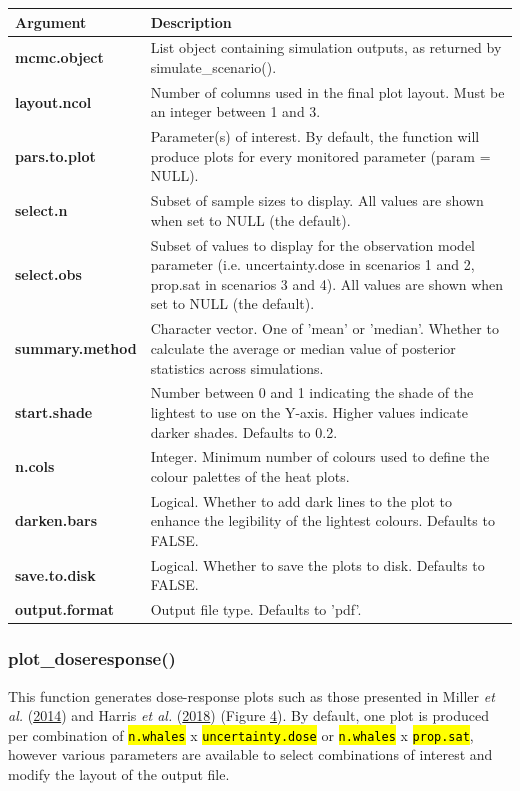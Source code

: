 \documentclass[
]{article}
\begin{document}
\renewcommand{\arraystretch}{1.4}

\begin{longtable}{>{\bfseries}l|>{\raggedright\arraybackslash}p{30em}}
\toprule
\textbf{Argument} & \textbf{Description}\\
\midrule
mcmc.object & List object containing simulation outputs, as returned by simulate\_scenario().\\
layout.ncol & Number of columns used in the final plot layout. Must be an integer between 1 and 3.\\
pars.to.plot & Parameter(s) of interest. By default, the function will produce plots for every monitored parameter (param = NULL).\\
select.n & Subset of sample sizes to display. All values are shown when set to NULL (the default).\\
select.obs & Subset of values to display for the observation model parameter (i.e. uncertainty.dose in scenarios 1 and 2, prop.sat in scenarios 3 and 4). All values are shown when set to NULL (the default).\\
\addlinespace
summary.method & Character vector. One of 'mean' or 'median'. Whether to calculate the average or median value of posterior statistics across simulations.\\
start.shade & Number between 0 and 1 indicating the shade of the lightest to use on the Y-axis. Higher values indicate darker shades. Defaults to 0.2.\\
n.cols & Integer. Minimum number of colours used to define the colour palettes of the heat plots.\\
darken.bars & Logical. Whether to add dark lines to the plot to enhance the legibility of the lightest colours. Defaults to FALSE.\\
save.to.disk & Logical. Whether to save the plots to disk. Defaults to FALSE.\\
\addlinespace
output.format & Output file type. Defaults to 'pdf'.\\
\bottomrule
\end{longtable}

\subsubsection{plot\_doseresponse()}

This function generates dose-response plots such as those presented in Miller \emph{et al.} (\protect\hyperlink{ref-Miller2014}{2014}) and Harris \emph{et al.} (\protect\hyperlink{ref-Harris2018}{2018}) (Figure \hyperlink{fig4}{4}). By default, one plot is produced per combination of \textcolor{codecolor}{\texttt{\hl{n.whales}}} x \textcolor{codecolor}{\texttt{\hl{uncertainty.dose}}} or \textcolor{codecolor}{\texttt{\hl{n.whales}}} x \textcolor{codecolor}{\texttt{\hl{prop.sat}}}, however various parameters are available to select combinations of interest and modify the layout of the output file.
\end{document}
